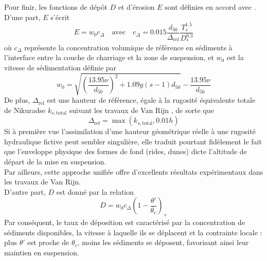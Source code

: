 \documentclass[11pt, a4paper, oneside]{report}
\begin{document}
Pour finir, les fonctions de dépôt $D$ et d'érosion $E$ sont définies en accord avec \cite{zhang1993sedimentation, van1984sediment2}. \\
D'une part, $E$ s'écrit
\begin{equation}
E = w_0 c_\Delta \quad \text{avec} \quad c_\Delta = 0.015 \frac{d_{50}}{\Delta_\text{ref}} \frac{T_s^{1.5}}{D_*^{0.3}}
\end{equation}
où $c_\Delta$ représente la concentration volumique de référence en sédiments à l'interface entre la couche de charriage et la zone de suspension, et $w_0$ est la vitesse de sédimentation définie par
\begin{equation}
w_0 = \sqrt{\left( \frac{13.95 \nu}{d_{50}} \right)^2 + 1.09 g (s-1) d_{50}} - \frac{13.95 \nu}{d_{50}}
\end{equation}
De plus, $\Delta_\text{ref}$ est une hauteur de référence, égale à la rugosité équivalente totale de Nikuradse $k_{s, \text{total}}$ suivant les travaux de Van Rijn \cite{van1984sediment2}, de sorte que
\begin{equation}
\Delta_\text{ref} = \max \left( k_{s, \text{total}}, 0.01 h \right)
\end{equation}
Si à première vue l'assimilation d'une hauteur géométrique réelle à une rugosité hydraulique fictive peut sembler singulière, elle traduit pourtant fidèlement le fait que l'enveloppe physique des formes de fond (rides, dunes) dicte l'altitude de départ de la mise en suspension. \\
Par ailleurs, cette approche unifiée offre d'excellents résultats expérimentaux dans les travaux de Van Rijn. \\
D'autre part, $D$ est donné par la relation
\begin{equation}
D = w_0 c_\Delta \left( 1 - \frac{\theta'}{\theta_c} \right)_+
\end{equation}
Par conséquent, le taux de déposition est caractérisé par la concentration de sédiments disponibles, la vitesse à laquelle ils se déplacent et la contrainte locale : plus $\theta'$ est proche de $\theta_c$, moins les sédiments se déposent, favorisant ainsi leur maintien en suspension.
\end{document}
